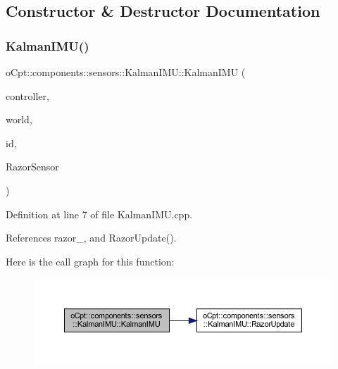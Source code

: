 \subsection{Constructor \& Destructor Documentation}
\hypertarget{classo_cpt_1_1components_1_1sensors_1_1_kalman_i_m_u_a4f57989596976ac685dde219cc951ad8}{}\label{classo_cpt_1_1components_1_1sensors_1_1_kalman_i_m_u_a4f57989596976ac685dde219cc951ad8} 
\subsubsection{\texorpdfstring{Kalman\+I\+M\+U()}{KalmanIMU()}}
{\footnotesize\ttfamily o\+Cpt\+::components\+::sensors\+::\+Kalman\+I\+M\+U\+::\+Kalman\+I\+MU (\begin{DoxyParamCaption}\item[{\hyperlink{classo_cpt_1_1i_controller_a6d89a95cd6ad68bb74adfaca2f36370f}{i\+Controller\+::ptr}}]{controller,  }\item[{\hyperlink{classo_cpt_1_1_world_aa6e591e3096d5de71e0cec9039663d67}{World\+::ptr}}]{world,  }\item[{std\+::string}]{id,  }\item[{\hyperlink{classo_cpt_1_1i_sensor_a03533d2c5dc66e332d70dbb3b5e3006a}{Razor\+::ptr}}]{Razor\+Sensor }\end{DoxyParamCaption})}



Definition at line 7 of file Kalman\+I\+M\+U.\+cpp.



References razor\+\_\+, and Razor\+Update().

Here is the call graph for this function\+:
\nopagebreak
\begin{figure}[H]
\begin{center}
\leavevmode
\includegraphics[width=350pt]{classo_cpt_1_1components_1_1sensors_1_1_kalman_i_m_u_a4f57989596976ac685dde219cc951ad8_cgraph}
\end{center}
\end{figure}
\hypertarget{classo_cpt_1_1components_1_1sensors_1_1_kalman_i_m_u_af2b2dfb55ebe25288b84764acca55dfa}{}\label{classo_cpt_1_1components_1_1sensors_1_1_kalman_i_m_u_af2b2dfb55ebe25288b84764acca55dfa} 
